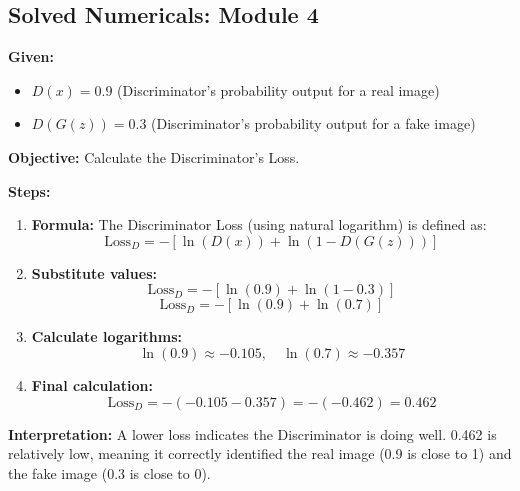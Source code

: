 \documentclass[11pt,a4paper]{article}
\begin{document}
\subsection{Solved Numericals: Module 4}

\begin{tcolorbox}[colback=blue!5!white,colframe=blue!75!black,title=\textbf{Numerical 1: Discriminator Loss Calculation}]
\textbf{Given:}
\begin{itemize}
    \item $D(x) = 0.9$ (Discriminator's probability output for a real image)
    \item $D(G(z)) = 0.3$ (Discriminator's probability output for a fake image)
\end{itemize}

\textbf{Objective:} Calculate the Discriminator's Loss.

\textbf{Steps:}
\begin{enumerate}
    \item \textbf{Formula:} The Discriminator Loss (using natural logarithm) is defined as:
    \[ \text{Loss}_D = - [ \ln(D(x)) + \ln(1 - D(G(z))) ] \]
    \item \textbf{Substitute values:}
    \[ \text{Loss}_D = - [ \ln(0.9) + \ln(1 - 0.3) ] \]
    \[ \text{Loss}_D = - [ \ln(0.9) + \ln(0.7) ] \]
    \item \textbf{Calculate logarithms:}
    \[ \ln(0.9) \approx -0.105, \quad \ln(0.7) \approx -0.357 \]
    \item \textbf{Final calculation:}
    \[ \text{Loss}_D = - ( -0.105 - 0.357 ) = - ( -0.462 ) = 0.462 \]
\end{enumerate}
\textbf{Interpretation:} A lower loss indicates the Discriminator is doing well. 0.462 is relatively low, meaning it correctly identified the real image (0.9 is close to 1) and the fake image (0.3 is close to 0).
\end{tcolorbox}

\vspace{1em}
\end{document}
